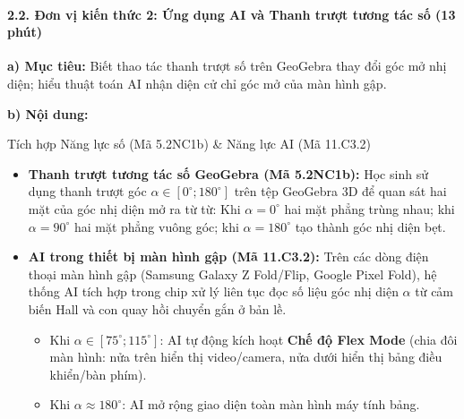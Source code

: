\documentclass[12pt, a4paper]{article}
\begin{document}
\paragraph{2.2. Đơn vị kiến thức 2: Ứng dụng AI và Thanh trượt tương tác số (13 phút)}

\noindent \textbf{a) Mục tiêu:}
Biết thao tác thanh trượt số trên GeoGebra thay đổi góc mở nhị diện; hiểu thuật toán AI nhận diện cử chỉ góc mở của màn hình gập.

\noindent \textbf{b) Nội dung:}
\begin{aibox}{Tích hợp Năng lực số (Mã 5.2NC1b) \& Năng lực AI (Mã 11.C3.2)}
\begin{itemize}[leftmargin=0.6cm]
    \item \textbf{Thanh trượt tương tác số GeoGebra (Mã 5.2NC1b):} Học sinh sử dụng thanh trượt góc $\alpha \in [0^\circ; 180^\circ]$ trên tệp GeoGebra 3D để quan sát hai mặt của góc nhị diện mở ra từ từ: Khi $\alpha = 0^\circ$ hai mặt phẳng trùng nhau; khi $\alpha = 90^\circ$ hai mặt phẳng vuông góc; khi $\alpha = 180^\circ$ tạo thành góc nhị diện bẹt.
    \item \textbf{AI trong thiết bị màn hình gập (Mã 11.C3.2):} Trên các dòng điện thoại màn hình gập (Samsung Galaxy Z Fold/Flip, Google Pixel Fold), hệ thống AI tích hợp trong chip xử lý liên tục đọc số liệu góc nhị diện $\alpha$ từ cảm biến Hall và con quay hồi chuyển gắn ở bản lề.
    \begin{itemize}
        \item Khi $\alpha \in [75^\circ; 115^\circ]$: AI tự động kích hoạt \textbf{Chế độ Flex Mode} (chia đôi màn hình: nửa trên hiển thị video/camera, nửa dưới hiển thị bảng điều khiển/bàn phím).
        \item Khi $\alpha \approx 180^\circ$: AI mở rộng giao diện toàn màn hình máy tính bảng.
    \end{itemize}
\end{itemize}
\end{aibox}
\end{document}
